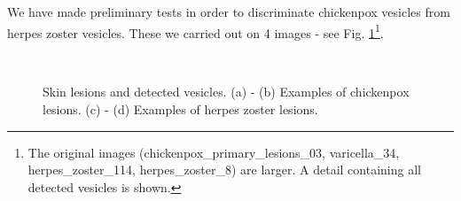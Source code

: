 \documentclass[oribibl]{llncs}
\begin{document}
We have made preliminary tests in order to discriminate chickenpox vesicles from herpes zoster vesicles. These we carried out on 4 images - see 
Fig. \ref{fig:varicelayherpeszoster}\footnote{The original images (chickenpox\_primary\_lesions\_03, varicella\_34, herpes\_zoster\_114, herpes\_zoster\_8) are larger. A detail containing all detected vesicles is shown.}.

\begin{figure}[h]
\centering
{}\hspace{4pt}
\hspace{4pt} \\
\hspace{4pt}\hspace{0.5pt}
\caption{Skin lesions and detected vesicles. (a) - (b) Examples of chickenpox lesions. (c) - (d) Examples of herpes zoster lesions.\label{fig:varicelayherpeszoster}}
\end{figure}
\end{document}
